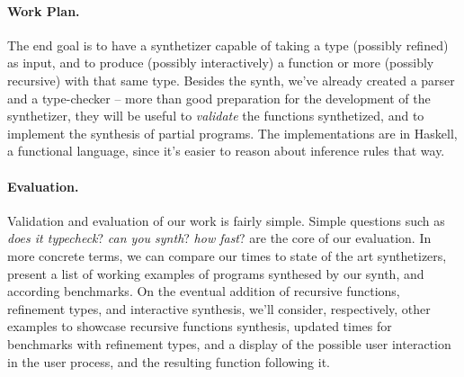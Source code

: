 \documentclass{llncs}
\newcommand{\lolli}{\multimap}
\newcommand{\tensor}{\otimes}
\newcommand{\one}{\mathbf{1}}
\newcommand{\bang}{{!}}
\newcommand{\mypara}[1]{\paragraph{\textbf{#1}.}}
\newcommand{\llet}[2]{\mathsf{let}\,#1\,\mathsf{in}\,#2}
\begin{document}
\mypara{Work Plan}
The end goal is to have a synthetizer capable of taking a type (possibly refined) as input,
and to produce (possibly interactively) a function or more (possibly recursive) with that same type.
Besides the synth, we've already created a parser and a type-checker -- more than good preparation for the
development of the synthetizer, they will be useful to \emph{validate} the functions synthetized, and to implement the
synthesis of partial programs. The implementations are in Haskell, a functional language, since it's easier to reason about inference rules that way.

\mypara{Evaluation}
Validation and evaluation of our work is fairly simple. Simple questions such as \emph{does it typecheck}? \emph{can you synth}? \emph{how fast}?
are the core of our evaluation. In more concrete terms, we can compare our times to state of the art synthetizers, present a list of working examples
of programs synthesed by our synth, and according benchmarks. On the eventual addition of recursive functions, refinement types, and interactive synthesis,
we'll consider, respectively, other examples to showcase recursive functions synthesis, updated times for benchmarks with refinement types, and a display of
the possible user interaction in the user process, and the resulting function following it.






\end{document}
